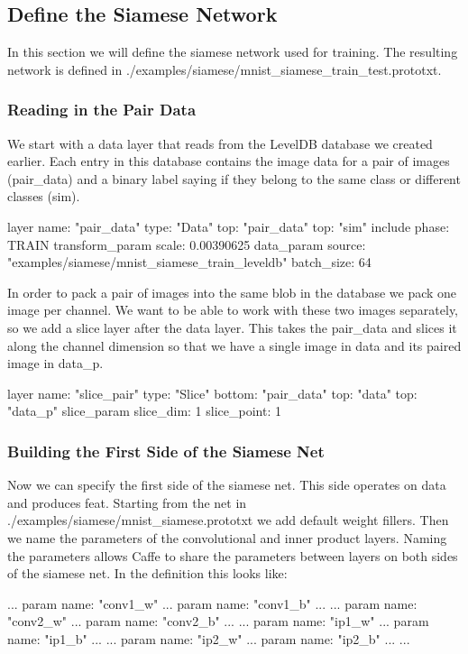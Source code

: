 \subsection*{Define the Siamese Network}

In this section we will define the siamese network used for training. The resulting network is defined in {\ttfamily ./examples/siamese/mnist\+\_\+siamese\+\_\+train\+\_\+test.prototxt}.

\subsubsection*{Reading in the Pair Data}

We start with a data layer that reads from the Level\+DB database we created earlier. Each entry in this database contains the image data for a pair of images ({\ttfamily pair\+\_\+data}) and a binary label saying if they belong to the same class or different classes ({\ttfamily sim}). \begin{DoxyVerb}layer {
  name: "pair_data"
  type: "Data"
  top: "pair_data"
  top: "sim"
  include { phase: TRAIN }
  transform_param {
    scale: 0.00390625
  }
  data_param {
    source: "examples/siamese/mnist_siamese_train_leveldb"
    batch_size: 64
  }
}
\end{DoxyVerb}


In order to pack a pair of images into the same blob in the database we pack one image per channel. We want to be able to work with these two images separately, so we add a slice layer after the data layer. This takes the {\ttfamily pair\+\_\+data} and slices it along the channel dimension so that we have a single image in {\ttfamily data} and its paired image in {\ttfamily data\+\_\+p.} \begin{DoxyVerb}layer {
  name: "slice_pair"
  type: "Slice"
  bottom: "pair_data"
  top: "data"
  top: "data_p"
  slice_param {
    slice_dim: 1
    slice_point: 1
  }
}
\end{DoxyVerb}


\subsubsection*{Building the First Side of the Siamese Net}

Now we can specify the first side of the siamese net. This side operates on {\ttfamily data} and produces {\ttfamily feat}. Starting from the net in {\ttfamily ./examples/siamese/mnist\+\_\+siamese.prototxt} we add default weight fillers. Then we name the parameters of the convolutional and inner product layers. Naming the parameters allows Caffe to share the parameters between layers on both sides of the siamese net. In the definition this looks like\+: \begin{DoxyVerb}...
param { name: "conv1_w" ...  }
param { name: "conv1_b" ...  }
...
param { name: "conv2_w" ...  }
param { name: "conv2_b" ...  }
...
param { name: "ip1_w" ...  }
param { name: "ip1_b" ...  }
...
param { name: "ip2_w" ...  }
param { name: "ip2_b" ...  }
...
\end{DoxyVerb}


